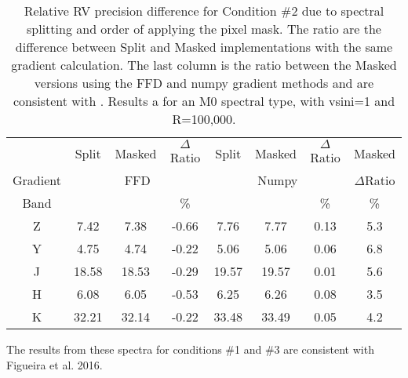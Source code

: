 
\begin{table}
    \centering
    \caption{Relative RV precision difference for Condition \#2 due to spectral splitting and order of applying the pixel mask. The ratio are the difference between Split and Masked implementations with the same gradient calculation. The last column is the ratio between the Masked versions using the FFD and numpy gradient methods and are consistent with . Results a for an M0 spectral type, with vsini=1 and R=100,000.}
    \begin{tabular}{c|ccc|ccc|c}
        \toprule
        & Split & Masked & $\Delta$Ratio & Split & Masked & $\Delta$Ratio & Masked \\
        Gradient & \multicolumn{3}{c|}{FFD}  & \multicolumn{3}{c|}{Numpy} & $\Delta$Ratio\\
        Band & \mps{} & \mps{} &  \%  & \mps{} & \mps{} &   \% & \% \\
        \midrule
        Z &  7.42 &  7.38 & -0.66 &  7.76 &  7.77 & 0.13 & 5.3\\
        Y &  4.75 &  4.74 & -0.22 &  5.06 &  5.06 & 0.06 & 6.8\\
        J & 18.58 & 18.53 & -0.29 & 19.57 & 19.57 & 0.01 & 5.6\\
        H &  6.08 &  6.05 & -0.53 &  6.25 &  6.26 & 0.08 & 3.5\\
        K & 32.21 & 32.14 & -0.22 & 33.48 & 33.49 & 0.05 & 4.2\\
        \bottomrule
    \end{tabular}
\end{table}

{\rd{} The results from these spectra for conditions \#1 and \#3 are consistent with Figueira et al. 2016. }
